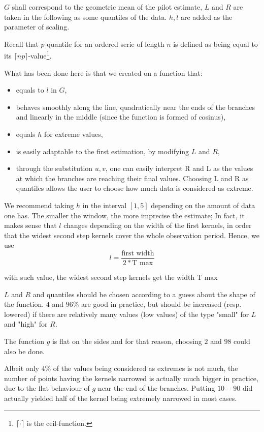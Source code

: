 $G$ shall correspond to the geometric mean of the pilot estimate, $L$ and $R$ are taken in the following as some quantiles of the data. $h,l$ are added as the parameter of scaling.

Recall that $p$-quantile for an ordered serie of length $n$ is defined as being equal to its $\lceil{np}\rceil$-value\footnote{$\lceil{\cdot}\rceil$ is the ceil-function.}.


What has been done here is that we created on a function that:



\begin{itemize}
\item equals to $l$ in $G$, 
\item behaves smoothly along the line, quadratically near the ends of the branches and linearly in the middle (since the function is formed of cosinus),
\item equals $h$ for extreme values,
\item is easily adaptable to the first estimation, by modifying $L$ and $R$,
\item through the substitution $u,v$, one can easily interpret R and L as the values at which the branches are reaching their final values. Choosing L and R as quantiles allows the user to choose how much data is considered as extreme. 
\end{itemize}

\begin{remarque}
We recommend taking $h$ in the interval $[1,5]$ depending on the amount of data one has. The smaller the window, the more imprecise the estimate; In fact, it makes sense that $l$ changes depending on the width of the first kernels, in order that the widest second step kernels cover the whole observation period. Hence, we use $$l = \frac{ \text{first width} }{2* \text{T max} }$$

with such value, the widest second step kernels get the width $\text{T max}$
\end{remarque}


\begin{remarque}
$L$ and $R$ and quantiles should be chosen according to a guess about the shape of the function. $4$ and $96 \%$ are good in practice, but should be increased (resp. lowered) if there are relatively many values (low values) of the type "small" for $L$ and "high" for $R$. 

The function $g$ is flat on the sides and for that reason, choosing $2$ and $98$ could also be done. 

Albeit only $4\%$ of the values being considered as extremes is not much, the number of points having the kernels narrowed is actually much bigger in practice, due to the flat behaviour of $g$ near the end of the branches. Putting $10-90$ did actually yielded half of the kernel being extremely narrowed in most cases.
\end{remarque}





